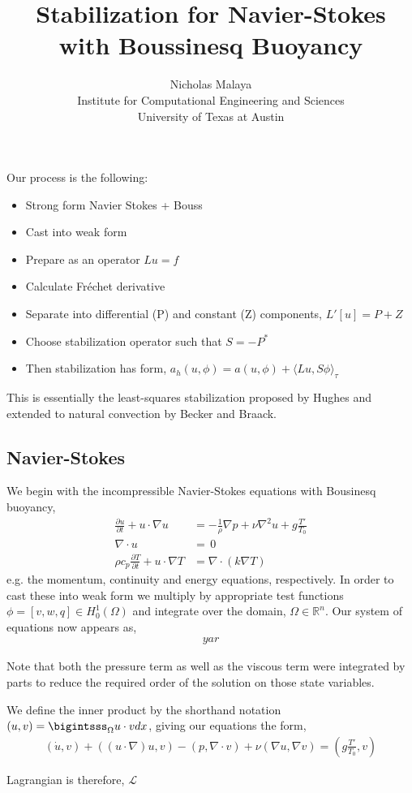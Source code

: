 \documentclass{article}
\title{\bf{Stabilization for Navier-Stokes with Boussinesq Buoyancy}}
\author{Nicholas Malaya \\ Institute for Computational Engineering and Sciences \\ University of Texas at Austin} \date{}
\begin{document}
\maketitle

%
%
Our process is the following: 

\begin{itemize}
 \item Strong form Navier Stokes + Bouss
 \item Cast into weak form
 \item Prepare as an operator $Lu=f$
 \item Calculate Fr\'echet derivative
 \item Separate into differential (P) and constant (Z) components,
       $L'[u] = P + Z$
 \item Choose stabilization operator such that $S = -P^*$
 \item Then stabilization has form, $a_h(u,\phi) = a(u,\phi) + \langle
       Lu,S\phi \rangle_\tau$
\end{itemize}

This is essentially the least-squares stabilization proposed by Hughes
and extended to natural convection by Becker and Braack. 

%
%
\newpage

\subsection{Navier-Stokes}

We begin with the incompressible Navier-Stokes equations with Bousinesq
buoyancy,
\begin{align}
 \frac{\partial u}{\partial t} + u \cdot \nabla u &= -\frac{1}{\rho}
 \nabla p + \nu \nabla^2 u + g \frac{T'}{T_0} \\
 \nabla \cdot u &= \, 0 \\
 \rho c_p \frac{\partial T}{\partial t} + u \cdot \nabla T &= \nabla
 \cdot (k \nabla T)
\end{align}
e.g. the momentum, continuity and energy equations, respectively. In
order to cast these into weak form we multiply by appropriate test
functions $\phi = \left[v,w,q\right] \in H^1_0(\Omega)$ and integrate over
the domain, $\Omega \in \mathbb{R}^n$. Our system of equations now
appears as, 
\begin{align}
 yar
\end{align}

Note that both the pressure term as well as the viscous term were
integrated by parts to reduce the required order of the solution on those
state variables. 

We define the inner product by the shorthand notation $(u,v) =
\bigintsss_\Omega u\cdot v dx $, giving our equations the form,  
\begin{align}
 (\dot u,v) + ((u \cdot \nabla) u, v) - (p,\nabla \cdot v) + \nu (\nabla
 u, \nabla v) = (g \frac{T'}{T_0},v)
\end{align}


Lagrangian is therefore,
$\mathcal{L}$
\end{document}
